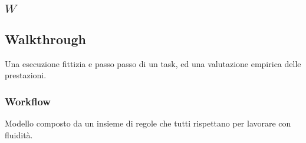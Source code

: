 \subsection*{\quad$W\quad$}
\subsection*{Walkthrough}
Una esecuzione fittizia e passo
passo di un task, ed una valutazione empirica delle
prestazioni. 
\subsubsection*{Workflow}
Modello composto da un insieme di regole che tutti rispettano per lavorare con fluidità.


